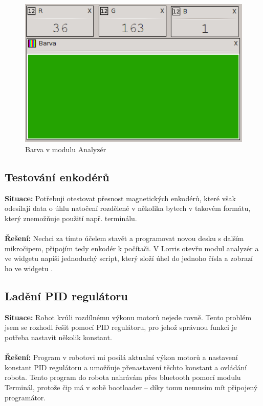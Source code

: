 \documentclass[12pt, a4paper, oneside]{article}
\begin{document}
\begin{figure}[h]
\begin{center}
\includegraphics{img/use_color.png}
\caption{Barva v modulu Analyzér}
\label{Terminal}
\end{center}
\end{figure}

\newpage
\subsection{Testování enkodérů}
{\bf Situace:} Potřebuji otestovat přesnost magnetických enkodérů, které však odesílají data o úhlu natočení rozdělené v několika bytech v takovém formátu, který znemožňuje použití např. terminálu.\\
\\
{\bf Řešení:} Nechci za tímto účelem stavět a programovat novou desku s dalším mikročipem, připojím tedy enkodér k počítači. V Lorris otevřu modul analyzér a ve widgetu  napíši  jednoduchý script, který složí úhel do jednoho čísla a zobrazí ho ve widgetu .


\newpage
\subsection{Ladění PID regulátoru}
{\bf Situace:} Robot kvůli rozdílnému výkonu motorů nejede rovně. Tento problém jsem se rozhodl řešit pomocí PID regulátoru, pro jehož správnou funkci je potřeba nastavit několik konstant. \\
\\
{\bf Řešení:} Program v robotovi mi posílá aktualní výkon motorů a nastavení konstant PID regulátoru a umožňuje přenastavení těchto konstant a ovládání robota. Tento program do robota nahrávám přes bluetooth pomocí modulu Terminál, protože čip má v sobě bootloader -- díky tomu nemusím mít připojený programátor.  
\end{document}
